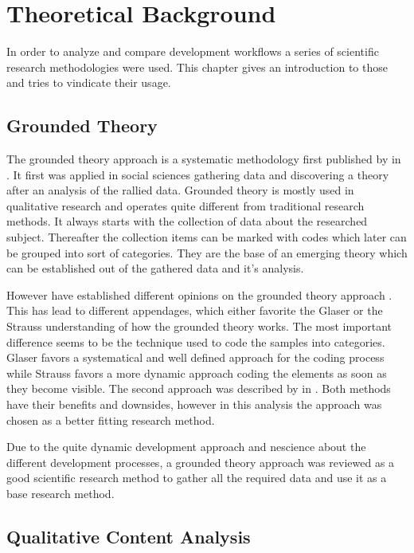 \chapter{Theoretical Background} %

In order to analyze and compare development workflows a series of scientific
research methodologies were used. This chapter gives an introduction to those
and tries to vindicate their usage.

\section{Grounded Theory} %

The grounded theory approach is a systematic methodology first published by
\textcite{Glaser1967} in \citeyear{Glaser1967}. It first was applied in social
sciences gathering data and discovering a theory after an analysis of the
rallied data. Grounded theory is mostly used in qualitative research and
operates quite different from traditional research methods. It always starts
with the collection of data about the researched subject. Thereafter the
collection items can be marked with codes which later can be grouped into sort
of categories. They are the base of an emerging theory which can be established
out of the gathered data and it's analysis.

However \citeauthor{Glaser1967} have established different opinions on the
grounded theory approach \cite{Heath2004}. This has lead to different
appendages, which either favorite the Glaser or the Strauss understanding of
how the grounded theory works. The most important difference seems to be the
technique used to code the samples into categories. Glaser favors a
systematical and well defined approach for the coding process while Strauss
favors a more dynamic approach coding the elements as soon as they become
visible. The second approach was described by \textcite{Strauss1990} in
\citeyear{Strauss1990}. Both methods have their benefits and downsides, however
in this analysis the \citeauthor{Strauss1990} approach was chosen as a better
fitting research method.

Due to the quite dynamic development approach and nescience about the different
development processes, a grounded theory approach was reviewed as a good
scientific research method to gather all the required data and use it as a base
research method.


\section{Qualitative Content Analysis} %

